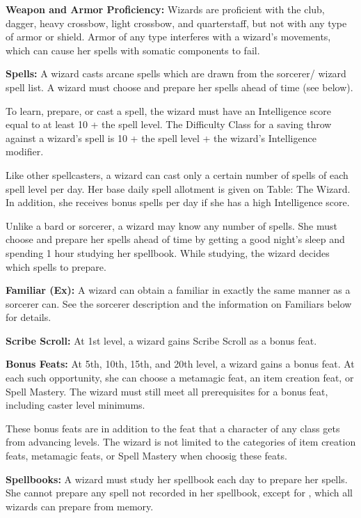 \classfeatures

\textbf{Weapon and Armor Proficiency:} Wizards are proficient with the club, dagger, heavy crossbow, light crossbow, and quarterstaff, but not with any type of armor or shield. Armor of any type interferes with a wizard's movements, which can cause her spells with somatic components to fail.

\textbf{Spells:} A wizard casts arcane spells which are drawn from the sorcerer/ wizard spell list. A wizard must choose and prepare her spells ahead of time (see below).

To learn, prepare, or cast a spell, the wizard must have an Intelligence score equal to at least 10 + the spell level. The Difficulty Class for a saving throw against a wizard's spell is 10 + the spell level + the wizard's Intelligence modifier.

Like other spellcasters, a wizard can cast only a certain number of spells of each spell level per day. Her base daily spell allotment is given on Table: The Wizard. In addition, she receives bonus spells per day if she has a high Intelligence score.

Unlike a bard or sorcerer, a wizard may know any number of spells. She must choose and prepare her spells ahead of time by getting a good night's sleep and spending 1 hour studying her spellbook. While studying, the wizard decides which spells to prepare.

\textbf{Familiar (Ex):} A wizard can obtain a familiar in exactly the same manner as a sorcerer can. See the sorcerer description and the information on Familiars below for details.

\textbf{Scribe Scroll:} At 1st level, a wizard gains Scribe Scroll as a bonus feat.

\textbf{Bonus Feats:} At 5th, 10th, 15th, and 20th level, a wizard gains a bonus feat. At each such opportunity, she can choose a metamagic feat, an item creation feat, or Spell Mastery. The wizard must still meet all prerequisites for a bonus feat, including caster level minimums.

These bonus feats are in addition to the feat that a character of any class gets from advancing levels. The wizard is not limited to the categories of item creation feats, metamagic feats, or Spell Mastery when choosig these feats.

\textbf{Spellbooks:} A wizard must study her spellbook each day to prepare her spells. She cannot prepare any spell not recorded in her spellbook, except for , which all wizards can prepare from memory.

